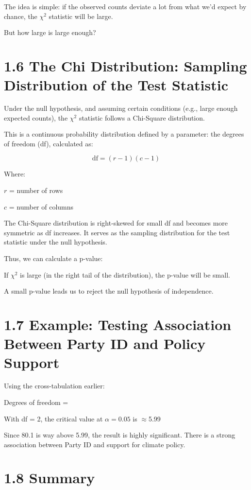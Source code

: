\documentclass[12pt]{article}
\begin{document}
The idea is simple: if the observed counts deviate a lot from what we’d expect by chance, the \(\chi^2\) statistic will be large.

But how large is large enough?

\section*{1.6 The Chi Distribution: Sampling Distribution of the Test Statistic}

Under the null hypothesis, and assuming certain conditions (e.g., large enough expected counts), the \(\chi^2\) statistic follows a Chi-Square distribution.

This is a continuous probability distribution defined by a parameter: the degrees of freedom (df), calculated as:

\[
\text{df} = (r - 1)(c - 1)
\]

Where:

\(r\) = number of rows

\(c\) = number of columns

The Chi-Square distribution is right-skewed for small df and becomes more symmetric as df increases. It serves as the sampling distribution for the test statistic under the null hypothesis.

Thus, we can calculate a p-value:

If \(\chi^2\) is large (in the right tail of the distribution), the p-value will be small.

A small p-value leads us to reject the null hypothesis of independence.

\section*{1.7 Example: Testing Association Between Party ID and Policy Support}

Using the cross-tabulation earlier:

Degrees of freedom = 

With df = 2, the critical value at \(\alpha = 0.05\) is $\approx$5.99

Since 80.1 is way above 5.99, the result is highly significant. There is a strong association between Party ID and support for climate policy.

\section*{1.8 Summary}
\end{document}
